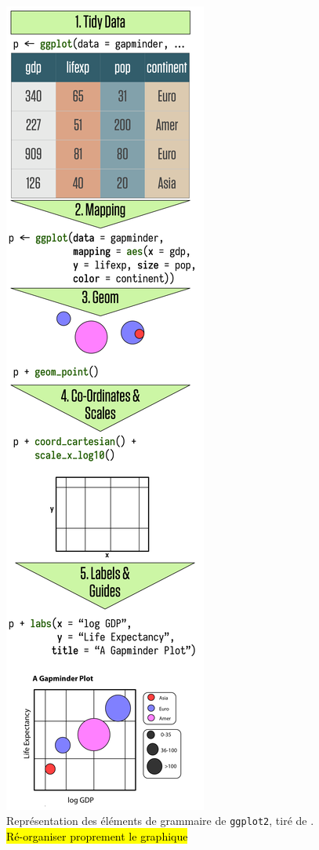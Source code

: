 \paragraph*{}
\begin{figure}
\centering
\includegraphics[width=.92\linewidth]{img/ch-03-ggplot-flow-vertical.png}
\caption{Représentation des éléments de grammaire de \texttt{ggplot2}, tiré de \cite{healy_data_2018}.\\
\hl{Ré-organiser proprement le graphique}%
}
\label{fig:socviz-ggplot2}
\end{figure}
